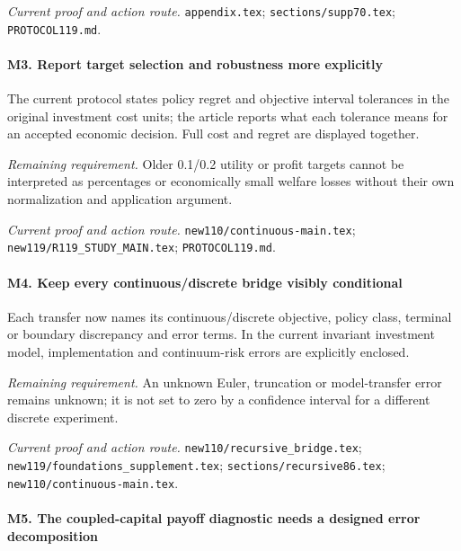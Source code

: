 \par\emph{Current proof and action route.} \nolinkurl{appendix.tex}; \nolinkurl{sections/supp70.tex}; \nolinkurl{PROTOCOL119.md}.

\paragraph{M3. Report target selection and robustness more explicitly}

The current protocol states policy regret and objective interval tolerances in the original investment cost units; the article reports what each tolerance means for an accepted economic decision. Full cost and regret are displayed together.

\par\emph{Remaining requirement.} Older 0.1/0.2 utility or profit targets cannot be interpreted as percentages or economically small welfare losses without their own normalization and application argument.

\par\emph{Current proof and action route.} \nolinkurl{new110/continuous-main.tex}; \nolinkurl{new119/R119_STUDY_MAIN.tex}; \nolinkurl{PROTOCOL119.md}.

\paragraph{M4. Keep every continuous/\allowbreak{}discrete bridge visibly conditional}

Each transfer now names its continuous/\allowbreak{}discrete objective, policy class, terminal or boundary discrepancy and error terms. In the current invariant investment model, implementation and continuum-risk errors are explicitly enclosed.

\par\emph{Remaining requirement.} An unknown Euler, truncation or model-transfer error remains unknown; it is not set to zero by a confidence interval for a different discrete experiment.

\par\emph{Current proof and action route.} \nolinkurl{new110/recursive_bridge.tex}; \nolinkurl{new119/foundations_supplement.tex}; \nolinkurl{sections/recursive86.tex}; \nolinkurl{new110/continuous-main.tex}.

\paragraph{M5. The coupled-capital payoff diagnostic needs a designed error decomposition}

